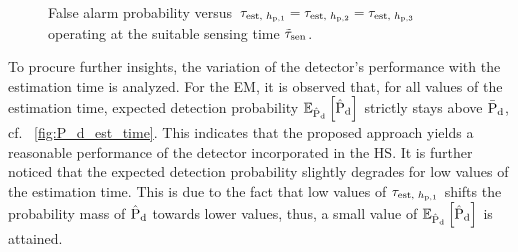 \begin{figure}[!t]

\centering
{}
\caption{False alarm probability versus $\tau_{\text{est, $h_{\text{p,1}}$}} = \tau_{\text{est, $h_{\text{p,2}}$}} = \tau_{\text{est, $h_{\text{p,3}}$}}$ operating at the suitable sensing time $\tilde{\tau}_{\text{sen}}$.}
\label{fig:P_f_est_time}
\end{figure}

To procure further insights, the variation of the detector's performance with the estimation time is analyzed. For the EM, it is observed that, for all values of the estimation time, expected detection probability ${\mathbb E}_{\hat{\text{P}}_{\text{d}}}\left[ \hat{\text{P}}_{\text{d}} \right]$ strictly stays above $\bar{\text{P}}_{\text{d}}$, cf. \figurename~\ref{fig:P_d_est_time}. This indicates that the proposed approach yields a reasonable performance of the detector incorporated in the HS. It is further noticed that the expected detection probability slightly degrades for low values of the estimation time. This is due to the fact that low values of $\tau_{\text{est, $h_{\text{p,1}}$}}$ shifts the probability mass of $\hat{\text{P}}_{\text{d}}$ towards lower values, thus, a small value of ${\mathbb E}_{\hat{\text{P}}_{\text{d}}}\left[ \hat{\text{P}}_{\text{d}} \right]$ is attained. 

